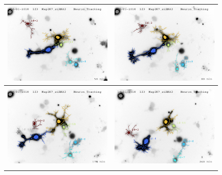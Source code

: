 \begin{figure}[t]
  \centering
       \begin{tabular}{@{}c@{}|c@{}}
        \includegraphics[width=62mm] {images/mv1_005.png}  &
        \includegraphics[width=62mm] {images/mv1_008.png} \\ [-1ex]
        \hline \\ [-2.8ex]
        \includegraphics[width=62mm] {images/mv1_017.png}  &
        \includegraphics[width=62mm] {images/mv1_026.png} \\ [-1ex]
        \hline \\ [-3.1ex]
       \end{tabular} 
       

\end{figure}
